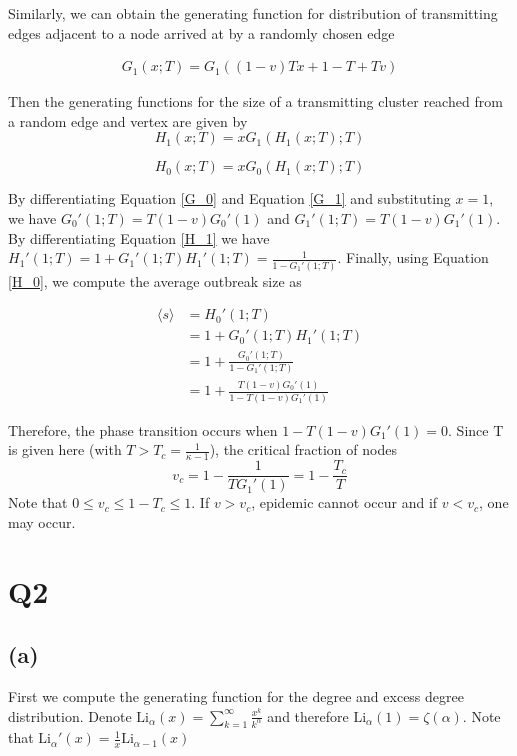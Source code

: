 \documentclass{article}
\begin{document}
Similarly, we can obtain the generating function for distribution of transmitting edges adjacent to a node arrived at by a randomly chosen edge

\begin{equation}\label{G_1}
	\begin{aligned}
		G_1(x;T) = G_1((1-v)Tx + 1 - T + Tv)
	\end{aligned}
\end{equation}

Then the generating functions for the size of a transmitting cluster reached from a random edge and vertex are given by
\begin{equation}\label{H_1}
	H_1(x;T) = xG_1(H_1(x;T);T)
\end{equation}

\begin{equation}\label{H_0}
	H_0(x;T) = xG_0(H_1(x;T);T)
\end{equation}

By differentiating Equation \ref{G_0} and Equation \ref{G_1} and substituting $ x=1 $, we have $ G_0'(1;T) = T(1-v)G_0'(1) $ and $ G_1'(1;T) = T(1-v)G_1'(1) $. By differentiating Equation \ref{H_1} we have $ H_1'(1;T) = 1 + G_1'(1;T)H_1'(1;T) = \frac{1}{1-G_1'(1;T)} $. Finally, using Equation \ref{H_0}, we compute the average outbreak size as 

\begin{equation}\label{eq: avg outbreak size}
	\begin{aligned}
		\langle s \rangle & = H_0'(1;T) \\
		& = 1 + G_0'(1;T) H_1'(1;T) \\
		& = 1 + \frac{G_0'(1;T)}{1-G_1'(1;T)} \\
		& = 1 + \frac{T(1-v)G_0'(1)}{1 - T(1-v)G_1'(1)}
	\end{aligned}
\end{equation}

Therefore, the phase transition occurs when $ 1 - T(1-v)G_1'(1) = 0 $. Since T is given here (with $ T>T_c =  \frac{1}{\kappa - 1}$), the critical fraction of nodes $$ v_c = 1 - \frac{1}{TG_1'(1)} = 1 - \frac{T_c}{T} $$Note that $0 \leq v_c \leq 1 - T_c \leq1$. If $ v>v_c $, epidemic cannot occur and if $ v<v_c $, one may occur. 

\section*{Q2}

\subsection*{(a)}
First we compute the generating function for the degree and excess degree distribution. Denote $ \mathrm{Li}_\alpha(x) =\sum_{k=1}^{\infty} \frac{x^k}{k^\alpha}$ and therefore $ \mathrm{Li}_\alpha(1) = \zeta(\alpha)$. Note that $ \mathrm{Li}_\alpha '(x) = \frac{1}{x}\mathrm{Li}_{\alpha-1}(x) $
\end{document}
